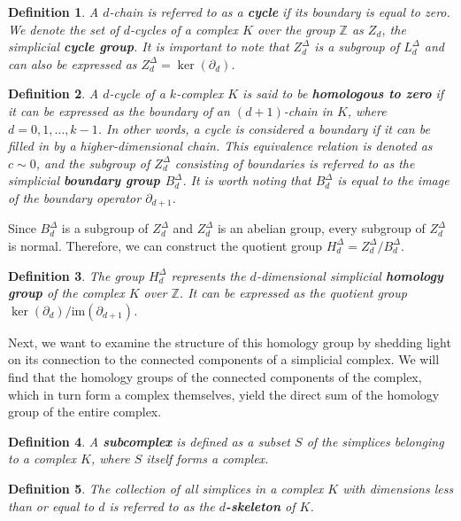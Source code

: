 \documentclass{amsart}
\newtheorem{definition}{Definition}[section]
\begin{document}
\begin{definition}
A $d$-chain is referred to as a \textbf{cycle} if its boundary is equal to zero. We denote the set of $d$-cycles of a complex $K$ over the group $\mathbb{Z}$ as $Z_d$, the simplicial \textbf{cycle group}. It is important to note that $Z^\Delta_d$ is a subgroup of $L^\Delta_d$ and can also be expressed as $Z^\Delta_d = \ker(\partial_d)$.
\end{definition}

\begin{definition}
A $d$-cycle of a $k$-complex $K$ is said to be \textbf{homologous to zero} if it can be expressed as the boundary of an $(d+1)$-chain in $K$, where $d=0,1,\ldots,k-1$. In other words, a cycle is considered a boundary if it can be \glqq filled in\grqq{} by a higher-dimensional chain. This equivalence relation is denoted as $c \sim 0$, and the subgroup of $Z^\Delta_d$ consisting of boundaries is referred to as the simplicial \textbf{boundary group $B^\Delta_d$}. It is worth noting that $B^\Delta_d$ is equal to the image of the boundary operator $\partial_{d+1}$.
\end{definition}

Since $B^\Delta_d$ is a subgroup of $Z^\Delta_d$ and $Z^\Delta_d$ is an abelian group, every subgroup of $Z^\Delta_d$ is normal. Therefore, we can construct the quotient group $H^\Delta_d = Z^\Delta_d / B^\Delta_d$.

\begin{definition}
The group $H^\Delta_d$ represents the $d$-dimensional simplicial \textbf{homology group} of the complex $K$ over $\mathbb{Z}$. It can be expressed as the quotient group $\ker(\partial_d) / \text{im}(\partial_{d+1})$.
\end{definition}

Next, we want to examine the structure of this homology group by shedding light on its connection to the connected components of a simplicial complex. We will find that the homology groups of the connected components of the complex, which in turn form a complex themselves, yield the direct sum of the homology group of the entire complex.

\begin{definition}
A \textbf{subcomplex} is defined as a subset $S$ of the simplices belonging to a complex $K$, where $S$ itself forms a complex.
\end{definition}

\begin{definition}
The collection of all simplices in a complex $K$ with dimensions less than or equal to $d$ is referred to as the \textbf{$d$-skeleton} of $K$.
\end{definition}
\end{document}
